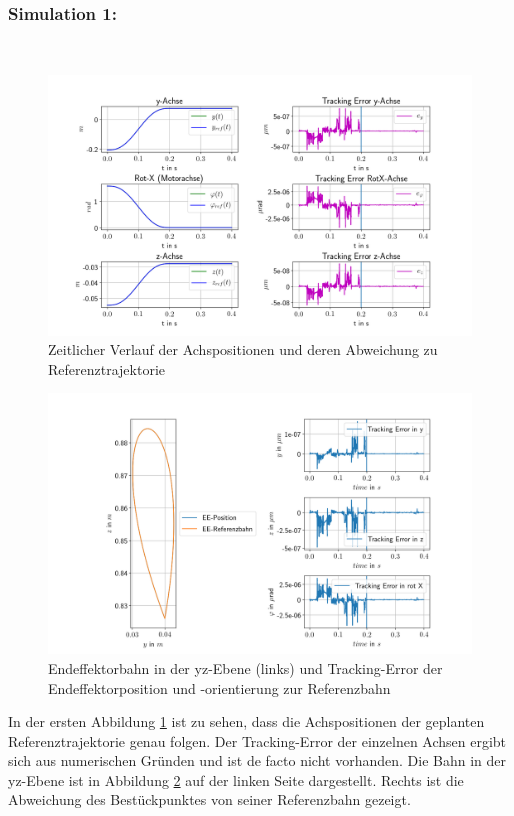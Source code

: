 \documentclass[10pt,a4paper]{iace.report}
\begin{document}
			 \subsubsection{\textcolor{blue!60!black}{Simulation 1:}}\leavevmode\\
				\begin{figure}[!h]
					\centering
					\includegraphics[width=0.99\linewidth]{./pics/posVerlaufAchsen_starr.png}
					\caption{Zeitlicher Verlauf der Achspositionen und deren Abweichung zu Referenztrajektorie}
					\label{fig:sim1pos}
				\end{figure}
				\begin{figure}[!h]
					\centering
					\includegraphics[width=0.99\linewidth]{./pics/endeffektor_starr.png}
					\caption{Endeffektorbahn in der yz-Ebene (links) und Tracking-Error der Endeffektorposition und -orientierung zur Referenzbahn}
					\label{fig:sim1ee}
				\end{figure}
				In der ersten Abbildung \ref{fig:sim1pos} ist zu sehen, dass die Achspositionen der geplanten Referenztrajektorie genau folgen. Der Tracking-Error der einzelnen Achsen ergibt sich aus numerischen Gründen und ist de facto nicht vorhanden. Die Bahn in der yz-Ebene ist in Abbildung \ref{fig:sim1ee} auf der linken Seite dargestellt. Rechts ist die Abweichung des Bestückpunktes von seiner Referenzbahn gezeigt.
				
\end{document}
